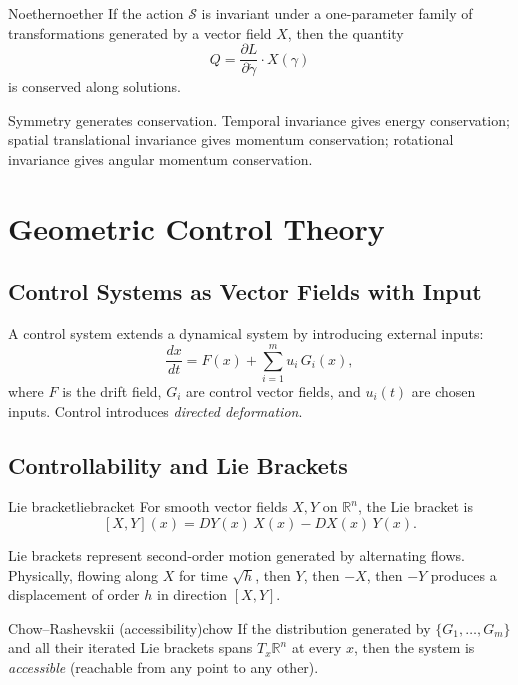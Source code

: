 \documentclass[12pt,openany]{book}
\newcommand{\R}{\mathbb{R}}
\begin{document}
\begin{theorem}{Noether}{noether}
  If the action $\mathcal{S}$ is invariant under a one-parameter family of
  transformations generated by a vector field $X$, then the quantity
  \[
    Q = \frac{\partial L}{\partial\dot\gamma}\cdot X(\gamma)
  \]
  is conserved along solutions.
\end{theorem}

Symmetry generates conservation. Temporal invariance gives energy conservation;
spatial translational invariance gives momentum conservation; rotational
invariance gives angular momentum conservation.

\chapter{Geometric Control Theory}
\label{ch:control}

\section{Control Systems as Vector Fields with Input}

A control system extends a dynamical system by introducing external inputs:
\[
  \frac{dx}{dt} = F(x) + \sum_{i=1}^m u_i\,G_i(x),
\]
where $F$ is the drift field, $G_i$ are control vector fields, and $u_i(t)$
are chosen inputs. Control introduces \emph{directed deformation}.

\section{Controllability and Lie Brackets}

\begin{definition}{Lie bracket}{liebracket}
  For smooth vector fields $X,Y$ on $\R^n$, the Lie bracket is
  \[
    [X,Y](x) = DY(x)\,X(x) - DX(x)\,Y(x).
  \]
\end{definition}

Lie brackets represent second-order motion generated by alternating flows.
Physically, flowing along $X$ for time $\sqrt{h}$, then $Y$, then $-X$, then
$-Y$ produces a displacement of order $h$ in direction $[X,Y]$.

\begin{theorem}{Chow--Rashevskii (accessibility)}{chow}
  If the distribution generated by $\{G_1,\dots,G_m\}$ and all their iterated
  Lie brackets spans $T_x\R^n$ at every $x$, then the system is
  \emph{accessible} (reachable from any point to any other).
\end{theorem}
\end{document}
